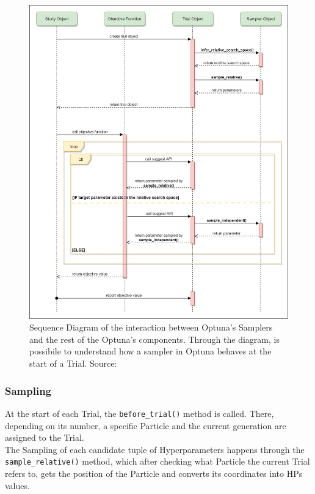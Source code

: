 \begin{figure}[H]
	\centering
	\includegraphics[width=15cm]{figures/figure-3.3.2.png}
	\caption[Sequence Diagram of Optuna's Samplers]{Sequence Diagram of the interaction between Optuna's Samplers and the rest of the Optuna's components. Through the diagram, is possibile to understand how a sampler in Optuna behaves at the start of a Trial. Source: \cite{Optuna}}
	\label{fig:figure-3.3.2}
\end{figure}

\subsubsection{Sampling}

At the start of each Trial, the \texttt{before\_trial()} method is called. There, depending on its number, a specific Particle and the current generation are assigned to the Trial.
\\[0.3cm]The Sampling of each candidate tuple of Hyperparameters happens through the \newline\texttt{sample\_relative()} method, which after checking what Particle the current Trial refers to, gets the position of the Particle and converts its coordinates into HPs values.

